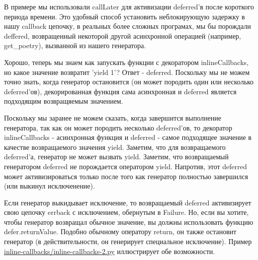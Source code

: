 В примере мы использовали callLater для активизации  
deferred'в после короткого периода времени. Это удобный 
способ установить неблокирующую задержку в нашу callback 
цепочку, в реальных более сложных програмах, 
мы бы порождали deffered, возвращенный 
некоторой другой асинхронной операцией (например, get\_poetry), 
вызванной из нашего генератора.


Хорошо, теперь мы знаем как запускать функции с декоратором inlineCallbacks, 
но какое значение возвратит 'yield 1'? Ответ - deferred. 
Поскольку мы не можем точно знать, 
когда генератор остановится (он может породить один или 
несколько deferred'ов), декорированная функция сама асинхронная и 
deferred является подходящим возвращяемым значением. 


Поскольку мы заранее не можем сказать, когда 
завершится выполнение генератора, так как он 
может породить несколько deferred'ов, то 
декоратор inlineCallbacks - асинхронная функция 
и deferred - самое подходящее значение в качестве 
возвращаемого значения yield. Заметим, что для возвращаемого  
deferred'а, генератор не может вызвать yield. Заметим, что 
возвращаемый генератором deferred не порождается оператором yield. 
Напротив, этот deferred может активизироваться только после того как 
генератор полностью завершился (или выкинул исключенение). 


Если генератор выкидывает исключение, 
то возвращаемый deferred активизирует свою 
цепочку errback с исключением, обернутым в Failure. 
Но, если вы хотите, чтобы генератор возвращал 
обычное значение, вы должны использовать функцию 
defer.returnValue. Подобно обычному оператору return, 
он также остановит генератор (в действительности, он 
генерирует специальное исключение). Пример 
\href{http://github.com/jdavisp3/twisted-intro/blob/master/inline-callbacks/inline-callbacks-2.py#L1}{inline-callbacks/inline-callbacks-2.py} иллюстрирует 
обе возможности.

